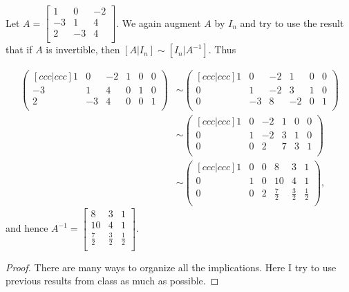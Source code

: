 \documentclass[12pt,letterpaper]{article}
\begin{document}
\begin{enumerate}
\begin{enumerate}
\Part Let  $A=\begin{bmatrix}
1 & 0 & -2\\
-3 &1 & 4\\
2 &-3 & 4\\
\end{bmatrix}$. We again augment $A$ by $I_n$ and try to use the result that if $A$ is invertible, then $[A|I_n]\sim [I_n | A^{-1}]$. Thus

\begin{align*}
	\begin{pmatrix}[ccc|ccc]
		1 & 0 & -2 & 1 & 0 & 0\\
		-3 &1 & 4 & 0 & 1 & 0\\
		2 &-3 & 4 & 0 & 0 &1\\
	\end{pmatrix}& \sim  \begin{pmatrix}[ccc|ccc]
		1 & 0 & -2 & 1 & 0 & 0\\
		0 &1 & -2 & 3 & 1 & 0\\
		0 & -3 & 8 & -2 & 0 &1\\
	\end{pmatrix}\\ &\sim \begin{pmatrix}[ccc|ccc]
		1 & 0 & -2 & 1 & 0 & 0\\
		0 &1 & -2 & 3 & 1 & 0\\
		0 &0 & 2 & 7 & 3 &1\\
	\end{pmatrix}\\ &\sim
\begin{pmatrix}[ccc|ccc]
	1 & 0 & 0 & 8 & 3 &1 \\
	0 &1 & 0 & 10 & 4 & 1\\
	0 &0 & 2 & \frac{7}{2} & \frac{3}{2} &\frac{1}{2}\\
\end{pmatrix},
\end{align*}
and hence $A^{-1}=\begin{bmatrix}
8 & 3 & 1\\
10 & 4 & 1\\
\frac{7}{2} & \frac{3}{2} & \frac{1}{2}\\
\end{bmatrix}.$

\end{enumerate}
  
  \Answer 
  
 \begin{proof} There are many ways to organize all the implications. Here I try to use previous results from class as much as possible.
 

\end{proof}
\end{enumerate}
\end{document}

